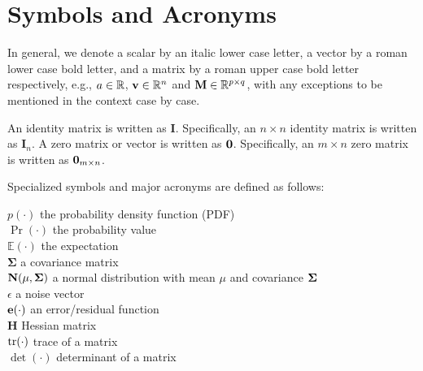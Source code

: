\chapter*{Symbols and Acronyms}

In general, we denote a scalar by an italic lower case letter,
a vector by a roman lower case bold letter,
and a matrix by a roman upper case bold letter respectively, e.g., 
$a \in \mathbb{R} $, $\mathbf{v} \in \mathbb{R}^n$ and $\mathbf{M} \in \mathbb{R}^{p \times q}$, with any exceptions to be mentioned in the context case by case.

An identity matrix is written as $\mathbf{I}$. Specifically, an $n\times n$ identity matrix is written as $\mathbf{I}_n$.
A zero matrix or vector is written as ${\bf 0}$. Specifically, an $m\times n$ zero matrix is written as ${\bf 0}_{m\times n}$.

Specialized symbols and major acronyms are defined as follows:

\newpage

\noindent
$p(\cdot)$                     \hfill the probability density function (PDF) \\
$\Pr(\cdot)$                   \hfill the probability value \\
$\mathbb{E}(\cdot)$            \hfill  the expectation \\
$\bm\Sigma$                    \hfill a covariance matrix \\
$\mathbf{N}(\mu,\bm\Sigma)$             \hfill a normal distribution with mean $\mu$ and covariance $\bm\Sigma$ \\
$\epsilon$                     \hfill a noise vector \\
${\bf e}(\cdot)$               \hfill an error/residual function \\
$\mathbf{H}$                   \hfill Hessian matrix \\
$\mathrm{tr}(\cdot)$                   \hfill trace of a matrix \\
$\det(\cdot)$                  \hfill determinant of a matrix \\

